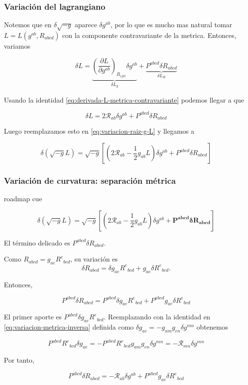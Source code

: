 \documentclass{beamer}
\newcommand{\Rcal}{\mathcal{R}}
\newcommand{\Eq}[1]{\eqref{#1}}
\newcommand{\RoadmapCue}[1]{%
    \begin{beamercolorbox}[
        wd=\textwidth,
        sep=.55ex,
        leftskip=.8ex,
        rounded=true
    ]{roadmap cue}

    \scriptsize
    \enspace #1

    \end{beamercolorbox}

    \vspace{.25em}
}
\begin{document}
\begin{frame}[label=nav-frame-026]
\frametitle{Variación del lagrangiano}
\small

Notemos que en $\delta \sqrt{-g}$ aparece $\delta g^{ab}$, por lo que es mucho mas natural tomar $L=L(g^{ab},R_{abcd})$ con la componente contravariante de la metrica. Entonces, variamos

\[
\delta L
=
\underbrace{\left( \dfrac{\partial L}{\partial g^{ab}}
\right)_{R_{ijkl}}
\delta g^{ab}}_{\delta L_g}
+
\underbrace{P^{abcd}\delta R_{abcd}}_{\delta L_R}\]

Usando la identidad \Eq{eq:derivada-L-metrica-contravariante} podemos llegar a que

\[
\delta L
=
2\Rcal_{ab}\delta g^{ab}
+
P^{abcd}\delta R_{abcd}
\]

Luego reemplazamos esto en \Eq{eq:variacion-raiz-g-L} y llegamos a

\begin{equation}
\delta(\sqrt{-g}L)
=
\sqrt{-g}
\left[
\left(2\Rcal_{ab}-\frac12g_{ab}L\right)\delta g^{ab}
+ P^{abcd}\delta R_{abcd}
\right]
\label{eq:variacion-raiz-g-L-expandida}
\end{equation}

\end{frame}

\begin{frame}[label=nav-frame-027]
\frametitle{Variación de curvatura: separación métrica}
\scriptsize
\RoadmapCue{
\[
\delta(\sqrt{-g}L)
=
\sqrt{-g}
\left[
\left(2\Rcal_{ab}-\frac12g_{ab}L\right)\delta g^{ab}
+ \bm{P^{abcd}\delta R_{abcd}}
\right]
\]
}

El término delicado es $P^{abcd}\delta R_{abcd}$. \newline

Como $R_{abcd}=g_{ae}R^e{}_{bcd}$, su variación es
\[
\delta R_{abcd}
=
\delta g_{ae}R^e{}_{bcd}
+
g_{ae}\delta R^e{}_{bcd}.
\]

Entonces,

\begin{equation}
P^{abcd}\delta R_{abcd}
=
P^{abcd}\delta g_{ae}R^e{}_{bcd}
+
P^{abcd}g_{ae}\delta R^e{}_{bcd}
\label{eq:separacion-variacion-riemann}
\end{equation}

El primer aporte es $P^{abcd}\delta g_{ae}R^e{}_{bcd}$. Reemplazando con la identidad en \Eq{eq:variacion-metrica-inversa} definida como $ \delta g_{ae}=-g_{am}g_{en}\delta g^{mn}$ obtenemos

\[
P^{abcd}R^e{}_{bcd}\delta g_{ae}
=
-P^{abcd}R^e{}_{bcd}g_{am}g_{en}\delta g^{mn} = -\Rcal_{mn}\delta g^{mn}
\]

Por tanto,

\begin{equation}
\boxed{
P^{abcd}\delta R_{abcd} = -\Rcal_{ab}\delta g^{ab} + P^{abcd}g_{ae}\delta R^e{}_{bcd}
}
\label{eq:variacion-riemann-Rcal}
\end{equation}

\end{frame}
\end{document}
